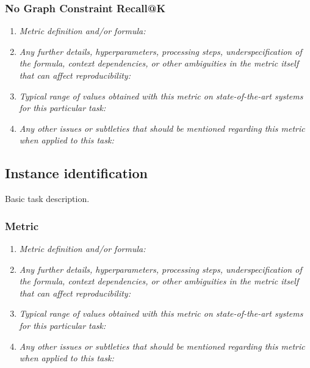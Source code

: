 \documentclass[a4paper,11pt]{article}
\begin{document}
        \subsubsection{No Graph Constraint Recall@K}
            \begin{enumerate}[label=\alph*.]
                \item \textit{Metric definition and/or formula:}
                \bigskip
                \item \textit{Any further details, hyperparameters, processing steps, underspecification of the formula, context dependencies, or other ambiguities in the metric itself that can affect reproducibility:}
                \bigskip
                \item \textit{Typical range of values obtained with this metric on state-of-the-art systems for this particular task:}
                \bigskip
                \item \textit{Any other issues or subtleties that should be mentioned regarding this metric when applied to this task:}
                \bigskip
            \end{enumerate}

    \subsection{Instance identification}
        Basic task description.
        \subsubsection{Metric}
            \begin{enumerate}[label=\alph*.]
                \item \textit{Metric definition and/or formula:}
                \bigskip
                \item \textit{Any further details, hyperparameters, processing steps, underspecification of the formula, context dependencies, or other ambiguities in the metric itself that can affect reproducibility:}
                \bigskip
                \item \textit{Typical range of values obtained with this metric on state-of-the-art systems for this particular task:}
                \bigskip
                \item \textit{Any other issues or subtleties that should be mentioned regarding this metric when applied to this task:}
                \bigskip
            \end{enumerate}
\end{document}
